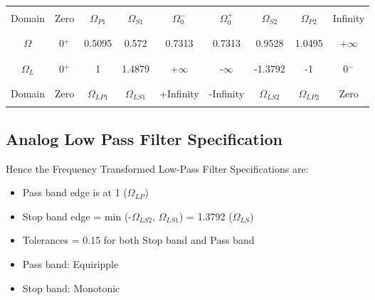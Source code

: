 \documentclass[12pt]{article}
\begin{document}
	\begin{center}
		\begin{tabular}{ |c|c|c|c|c|c|c|c|c| }
			\hline
			&&&&&&&&\\
			Domain & Zero & $\Omega_{P1}$ & $\Omega_{S1}$ &$\Omega_0^-$ &$\Omega_0^+$ & $\Omega_{S2}$& $\Omega_{P2}$ & Infinity\\
			&&&&&&&&\\
			\hline
			&&&&&&&&\\
			$\Omega$ & 0$^+$ & 0.5095 & 0.572 &0.7313 &0.7313&0.9528& 1.0495 & +$\infty$\\
			&&&&&&&&\\
			\hline
			&&&&&&&&\\
			$\Omega_L$ & 0$^+$ & 1 & 1.4879 & +$\infty$ & -$\infty$ & -1.3792 & -1 & 0$^-$\\
			&&&&&&&&\\
			\hline
			&&&&&&&&\\
			Domain& Zero & $\Omega_{LP1}$ & $\Omega_{LS1}$ &+Infinity &-Infinity & $\Omega_{LS2}$& $\Omega_{LP2}$ &Zero\\
			&&&&&&&&\\
			\hline
		\end{tabular}
	\end{center}
	
	\color{cyan}
	\subsection{Analog Low Pass Filter Specification}
	\color{black}
	Hence the Frequency Transformed Low-Pass Filter Specifications are:
	\begin{itemize}
		\item Pass band edge is at 1 ($\Omega_{LP}$)
		\item Stop band edge = min (-$\Omega_{LS2}$, $\Omega_{LS1}$) = 1.3792 ($\Omega_{LS}$)
		\item Tolerances = 0.15 for both Stop band and Pass band
		\item Pass band: Equiripple
		\item Stop band: Monotonic
	\end{itemize}
	
	
	\color{cyan}
\end{document}
